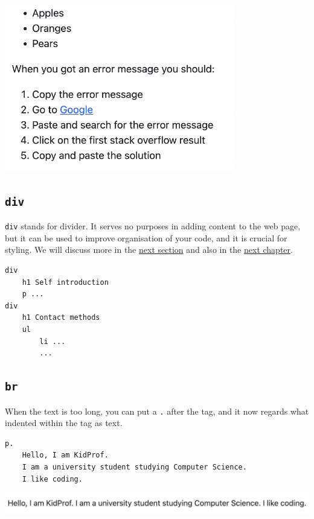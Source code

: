 \includegraphics[width=10cm]{images/ch5-ulol.png}

\subsection{\texttt{div}}

\texttt{div} stands for divider. It serves no purposes in adding content to the web page, but it can be used to improve organisation of your code, and it is crucial for styling. We will discuss more in the \hyperref[sec:classesids]{next section} and also in the \hyperref[sec:ch6]{next chapter}.
\vspace{6mm}

\begin{lstlisting}[language=pug]
div
    h1 Self introduction
    p ...
div
    h1 Contact methods
    ul
        li ...
        ...
\end{lstlisting}

\subsection{\texttt{br}}

When the text is too long, you can put a \texttt{.} after the tag, and it now regards what indented within the tag as text.

\begin{lstlisting}[language=pug]
p.
    Hello, I am KidProf.
    I am a university student studying Computer Science.
    I like coding.
\end{lstlisting}

\includegraphics[width=15cm]{images/ch5-textinaline.png}

